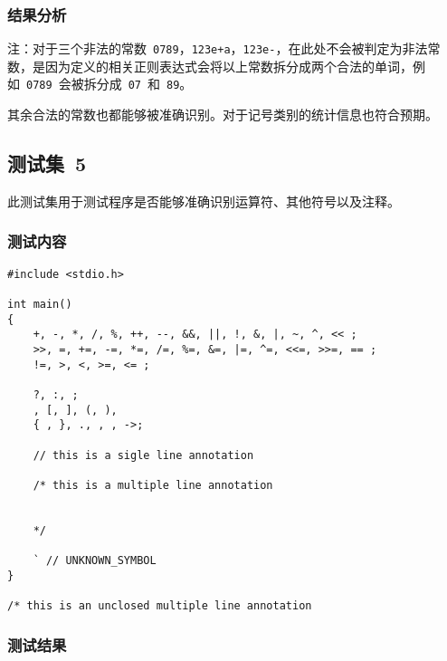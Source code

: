 \documentclass[lang=cn,11pt,a4paper]{paper}
\begin{document}
\subsubsection{结果分析}

注：对于三个非法的常数\ \lstinline{0789}，\lstinline{123e+a}，\lstinline{123e-}，在此处不会被判定为非法常数，是因为定义的相关正则表达式会将以上常数拆分成两个合法的单词，例如\ \lstinline{0789}\ 会被拆分成\ \lstinline{07}\ 和\ \lstinline{89}。

其余合法的常数也都能够被准确识别。对于记号类别的统计信息也符合预期。

\subsection{测试集\ 5}

此测试集用于测试程序是否能够准确识别运算符、其他符号以及注释。

\subsubsection{测试内容}

\begin{lstlisting}
#include <stdio.h>

int main()
{
    +, -, *, /, %, ++, --, &&, ||, !, &, |, ~, ^, << ;
    >>, =, +=, -=, *=, /=, %=, &=, |=, ^=, <<=, >>=, == ;
    !=, >, <, >=, <= ;

    ?, :, ;
    , [, ], (, ),
    { , }, ., , , ->;

    // this is a sigle line annotation

    /* this is a multiple line annotation


    */

    ` // UNKNOWN_SYMBOL
}

/* this is an unclosed multiple line annotation

\end{lstlisting}

\subsubsection{测试结果}
\end{document}
